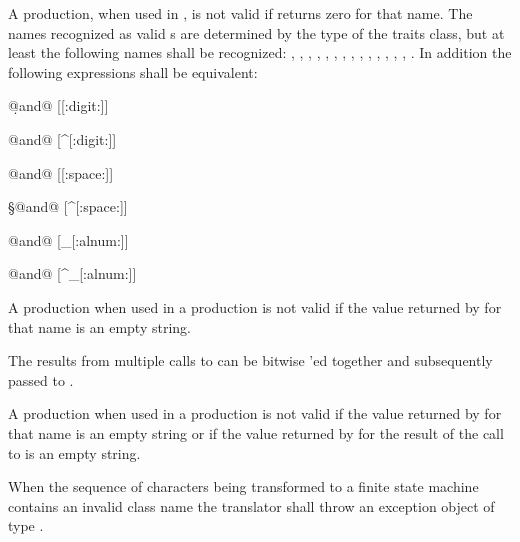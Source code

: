\pnum
A  production, when used in ,
is not valid if  returns zero for
that name.  The names recognized as valid s are
determined by the type of the traits class, but at least the following
names shall be recognized:
, , , , ,
, , , , ,
, , , , .
In addition the following expressions shall be equivalent:
\begin{outputblock}
\d @\textnormal{and}@ [[:digit:]]

\D @\textnormal{and}@ [^[:digit:]]

\s @\textnormal{and}@ [[:space:]]

\S @\textnormal{and}@ [^[:space:]]

\w @\textnormal{and}@ [_[:alnum:]]

\W @\textnormal{and}@ [^_[:alnum:]]
\end{outputblock}

\pnum
{}%
%
A  production when used in
a  production is not valid
if the value returned by  for
that name is an empty string.

\pnum
{}%
%
%
%
The results from multiple calls
to  can be bitwise 'ed
together and subsequently passed to .

\pnum
A  production when used in
a  production is not valid if the value
returned by  for that name is an
empty string or if the value returned by 
for the result of the call to 
is an empty string.

\pnum
{}%
When the sequence of characters being transformed to a finite state
machine contains an invalid class name the translator shall throw an
exception object of type .

